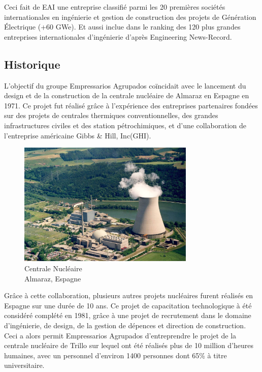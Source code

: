 \documentclass[11pt, openright]{book}
\begin{document}
Ceci fait de EAI une entreprise classifié parmi les 20 premières sociétés internationales en ingénierie et gestion de construction des projets de Génération Électrique (+60 GWe)\cite{EAI1}. Et aussi inclue dans le ranking des 120 plus grandes entreprises internationales d'ingénierie d'après Engineering News-Record.\cite{EAI2}

\subsection{Historique}

L'objectif du groupe Empressarios Agrupados coïncidait avec le lancement du design et de la construction de la centrale nucléaire de Almaraz en Espagne en 1971. Ce projet fut réalisé grâce à l'expérience des entreprises partenaires fondées sur des projets de centrales thermiques conventionnelles, des grandes infrastructures civiles et des station pétrochimiques, et d'une collaboration de l'entreprise américaine Gibbs \& Hill, Inc(GHI).

\begin{figure}
    \vspace{-10pt}
    \includegraphics[width=0.75\textwidth]{./object/Almaraz.jpg}
    \caption[caption]{Centrale Nucléaire \\ Almaraz, Espagne\endtabular}
\end{figure}

Grâce à cette collaboration, plusieurs autres projets nucléaires furent réalisés en Espagne sur une durée de 10 ans. Ce projet de capacitation technologique à été considéré complété en 1981, grâce à une projet de recrutement dans le domaine d'ingénierie, de design, de la gestion de dépen\-ces et direction de construction. Ceci a alors permit Empressarios Agrupados d'entreprendre le projet de la centrale nucléaire de Trillo sur lequel ont été réalisés plus de 10 million d'heures humaines, avec un personnel d'environ 1400 personnes dont 65\% à titre universitaire.
\end{document}
